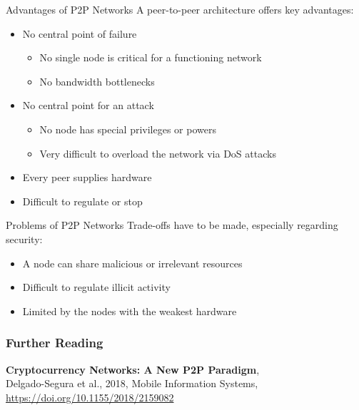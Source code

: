 \documentclass[]{beamer}
\begin{document}
\begin{frame}{Advantages of P2P Networks}
	A peer-to-peer architecture offers key advantages:
	\vspace{0.3 cm}
	\begin{itemize}
		\item No central point of failure
		\begin{itemize}
			\item No single node is critical for a functioning network
			\item No bandwidth bottlenecks
		\end{itemize}
		\vspace{0.3 cm}
		\item<2-> No central point for an attack
			\begin{itemize}
				\item No node has special privileges or powers
				\item Very difficult to overload the network via DoS attacks
			\end{itemize}	
		\vspace{0.3 cm}
		\item<3-> Every peer supplies hardware
		\vspace{0.3 cm}
		\item<4-> Difficult to regulate or stop
	\end{itemize}
	
\end{frame}

\begin{frame}{Problems of P2P Networks}
	Trade-offs have to be made, especially regarding security:
	\vspace{0.3 cm}
	\begin{itemize}
		\item A node can share malicious or irrelevant resources
		\vspace{0.3 cm}
		\item<2-> Difficult to regulate illicit activity
		\vspace{0.3 cm}
		\item<3-> Limited by the nodes with the weakest hardware
	\end{itemize}
	
\end{frame}


\begin{frame}%
\frametitle{Further Reading}
		\textbf{Cryptocurrency Networks: A New P2P Paradigm}, \\
		Delgado-Segura et al., 2018, Mobile Information Systems, \\
		\link \url{https://doi.org/10.1155/2018/2159082}
\end{frame}
\end{document}
